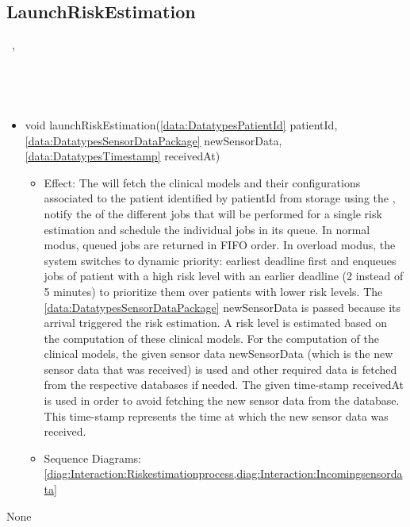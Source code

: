   \subsection{LaunchRiskEstimation}\label{int:InterfacesLaunchRiskEstimation}
    \begin{description}
      \item[Provided by:] \iconcomponent{}~, \iconcomponent{}~
      \item[Required by:] \iconcomponent{}~ 
      \item[Operations:] ~
    \begin{itemize}[noitemsep,nolistsep,leftmargin=-.25cm]
      \item \textsf{void launchRiskEstimation(\ref{data:DatatypesPatientId} patientId, \ref{data:DatatypesSensorDataPackage} newSensorData, \ref{data:DatatypesTimestamp} receivedAt)}
        \begin{itemize}[noitemsep,nolistsep]
           \item Effect: The  will fetch the clinical models and their configurations associated to the patient identified by patientId from storage using the , notify the  of the different jobs that will be performed for a single risk estimation and schedule the individual jobs in its queue.
In normal modus, queued jobs are returned in FIFO order. In overload modus, the system switches to dynamic priority: earliest deadline first and enqueues jobs of patient with a high risk level with an earlier deadline (2 instead of 5 minutes) to prioritize them over patients with lower risk levels.
The \ref{data:DatatypesSensorDataPackage} newSensorData is passed because its arrival triggered the risk estimation. A risk level is estimated based on the computation of these clinical models. For the computation of the clinical models, the given sensor data newSensorData (which is the new sensor data that was received) is used and other required data is fetched  from the respective databases if needed. The given time-stamp receivedAt is used in order to avoid fetching the new sensor data from the database. This time-stamp represents the time at which the new sensor data was received. 
           \item Sequence Diagrams: \cref{diag:Interaction:Riskestimationprocess,diag:Interaction:Incomingsensordata}
        \end{itemize}
    \end{itemize}
      \item[Diagrams:] None
    \end{description}

